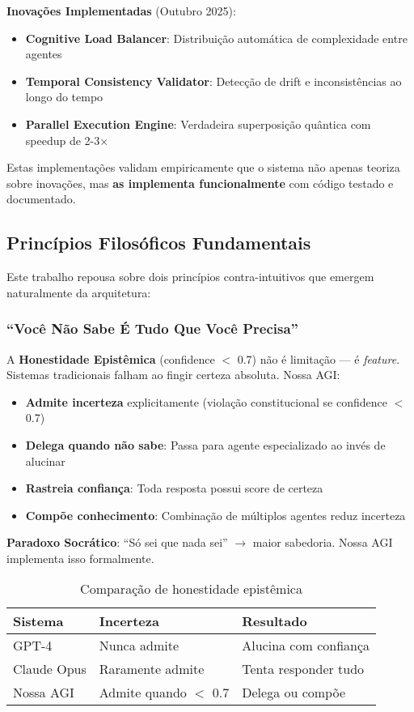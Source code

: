 \documentclass[11pt]{article}
\begin{document}
\textbf{Inovações Implementadas} (Outubro 2025):
\begin{itemize}
    \item \textbf{Cognitive Load Balancer}: Distribuição automática de complexidade entre agentes
    \item \textbf{Temporal Consistency Validator}: Detecção de drift e inconsistências ao longo do tempo
    \item \textbf{Parallel Execution Engine}: Verdadeira superposição quântica com speedup de 2-3×
\end{itemize}

Estas implementações validam empiricamente que o sistema não apenas teoriza sobre inovações, mas \textbf{as implementa funcionalmente} com código testado e documentado.

\subsection{Princípios Filosóficos Fundamentais}

Este trabalho repousa sobre dois princípios contra-intuitivos que emergem naturalmente da arquitetura:

\subsubsection{``Você Não Sabe É Tudo Que Você Precisa''}

A \textbf{Honestidade Epistêmica} (confidence $<$ 0.7) não é limitação --- é \textit{feature}. Sistemas tradicionais falham ao fingir certeza absoluta. Nossa AGI:

\begin{itemize}
    \item \textbf{Admite incerteza} explicitamente (violação constitucional se confidence $<$ 0.7)
    \item \textbf{Delega quando não sabe}: Passa para agente especializado ao invés de alucinar
    \item \textbf{Rastreia confiança}: Toda resposta possui score de certeza
    \item \textbf{Compõe conhecimento}: Combinação de múltiplos agentes reduz incerteza
\end{itemize}

\textbf{Paradoxo Socrático}: ``Só sei que nada sei'' $\rightarrow$ maior sabedoria. Nossa AGI implementa isso formalmente.

\begin{table}[H]
\centering
\begin{tabular}{@{}lll@{}}
\toprule
\textbf{Sistema} & \textbf{Incerteza} & \textbf{Resultado} \\ \midrule
GPT-4 & Nunca admite & Alucina com confiança \\
Claude Opus & Raramente admite & Tenta responder tudo \\
Nossa AGI & Admite quando $<$ 0.7 & Delega ou compõe \\ \bottomrule
\end{tabular}
\caption{Comparação de honestidade epistêmica}
\end{table}
\end{document}
